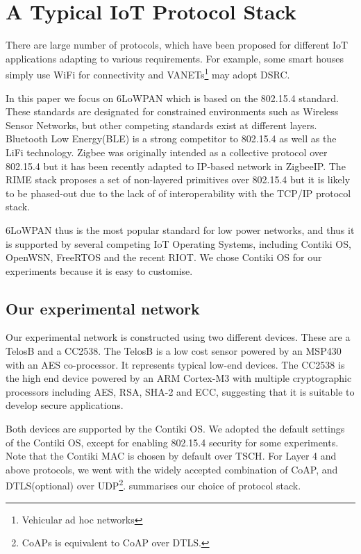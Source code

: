 
\section{A Typical IoT Protocol Stack\label{sec: IotProtocols}} 

There are large number of protocols, which have been proposed for different IoT applications adapting to various requirements. For example, some smart houses simply use WiFi for connectivity and VANETs\footnote{Vehicular ad hoc networks} may adopt DSRC\cite{DSRC}. 

In this paper we focus on 6LoWPAN\cite{rfc4944} which is based on the 802.15.4\cite{802154} standard. These standards are designated for constrained environments such as Wireless Sensor Networks,  but other competing standards exist at different layers. Bluetooth Low Energy(BLE)\cite{BLE} is a strong competitor to 802.15.4 as well as the LiFi\cite{LiFi} technology. Zigbee\cite{Zigbee} was originally intended as a collective protocol over 802.15.4 but it has been recently adapted to IP-based network in ZigbeeIP\cite{ZigbeeIp}. The RIME stack\cite{RIME} proposes a set of non-layered primitives over 802.15.4 but it is likely to be phased-out due to the lack of of interoperability with the TCP/IP protocol stack. 

6LoWPAN thus is the most popular standard for low power networks, and thus it is supported by several competing IoT Operating Systems, including Contiki OS\cite{Contiki}, OpenWSN\cite{OpenWSN}, FreeRTOS\cite{FreeRTOS} and the recent RIOT\cite{RIOT}. We chose Contiki OS for our experiments because it is easy to customise.

\subsection{Our experimental network}
Our experimental network is constructed using two different devices. These are a TelosB\cite{TelosB} and a CC2538\cite{CC2538}. The TelosB is a low cost sensor powered by an MSP430 with an AES co-processor. It represents typical low-end devices. The CC2538 is the high end device powered by an ARM Cortex-M3 with multiple cryptographic processors including AES, RSA, SHA-2 and ECC, suggesting that it is suitable to develop secure applications. %

Both devices are supported by the Contiki OS. We adopted the default settings of the Contiki OS, except for enabling 802.15.4 security\cite{802154} for some experiments. Note that the Contiki MAC\cite{ContikiMAC} is chosen by default over TSCH\cite{TSCH}. For Layer 4\cite{OSI} and above protocols, we went with the widely accepted combination of CoAP\cite{rfc7252}, and DTLS\cite{rfc6347}(optional) over UDP\cite{rfc768}\footnote{CoAPs is equivalent to CoAP over DTLS.}.  summarises our choice of protocol stack.

